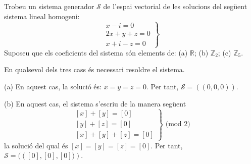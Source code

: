 \begin{exercici}
Trobeu un sistema generador $\mathcal{S}$ de l’espai vectorial de les
solucions del següent sistema lineal homogeni:%
\begin{equation*}
\left.
\begin{array}{r}
x-i=0 \\
2x+y+z=0 \\
x+i-z=0%
\end{array}%
\right\}
\end{equation*}%
Suposeu que els coeficients del sistema són elements de: (a) $\mathbb{R}$;
(b) $\mathbb{Z}_{2}$; (c) $\mathbb{Z}_{5}$.

\end{exercici}
\begin{solucio}
En qualsevol dels tres cass és necessari resoldre el sistema.

(a) En aquest cas, la solució és: $x=y=z=0$. Per tant, $\mathcal{S}%
=\left( (0,0,0)\right) $.

(b) En aquest cas, el sistema s’escriu de la manera següent%
\begin{equation*}
\left.
\begin{array}{r}
\left[ x\right] +\left[ y\right] =\left[ 0\right] \\
\left[ y\right] +\left[ z\right] =\left[ 0\right] \\
\left[ x\right] +\left[ y\right] +\left[ z\right] =\left[ 0\right]%
\end{array}%
\right\} \text{ (mod }2\text{)}
\end{equation*}%
la solució del qual és $\left[ x\right] =\left[ y\right] =\left[ z\right] =%
\left[ 0\right] $. Per tant, $\mathcal{S}=(\left( \left[ 0\right] ,\left[ 0%
\right] ,\left[ 0\right] )\right) $.


\end{solucio}
